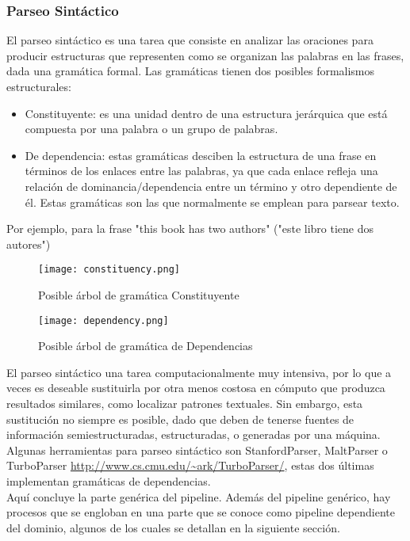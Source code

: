 \subsubsection{Parseo Sintáctico}
El parseo sintáctico es una tarea que consiste en analizar las oraciones para producir estructuras que representen como se organizan las palabras en las frases, dada una gramática formal. Las gramáticas tienen dos posibles formalismos estructurales: 
\begin{itemize}
\item Constituyente: es una unidad dentro de una estructura jerárquica que está compuesta por una palabra o un grupo de palabras. \newline
\item De dependencia: estas gramáticas desciben la estructura de una frase en términos de los enlaces entre las palabras, ya que cada enlace refleja una relación de dominancia/dependencia entre un término y otro dependiente de él. Estas gramáticas son las que normalmente se emplean para parsear texto. 
\end{itemize}
Por ejemplo, para la frase \textsf{"this book has two authors" ("este libro tiene dos autores")} \newline
\begin{figure}[H]%
\centering
\texttt{[image: constituency.png]}  %
\label{}
\caption{Posible árbol de gramática Constituyente}   
\end{figure}
\begin{figure}[H]%
\centering
\texttt{[image: dependency.png]}  %
\label{}
\caption{Posible árbol de gramática de Dependencias}   
\end{figure}

 El parseo sintáctico una tarea computacionalmente muy intensiva, por lo que a veces es deseable sustituirla por otra menos costosa en cómputo que produzca resultados similares, como \textsf{localizar patrones textuales}. Sin embargo, esta sustitución no siempre es posible, dado que deben de tenerse fuentes de información semiestructuradas, estructuradas, o generadas por una máquina. \newline
 Algunas herramientas para parseo sintáctico son \textsf{StanfordParser}, \textsf{MaltParser} \citet{nivre2006maltparser} o \textsf{TurboParser} \url{http://www.cs.cmu.edu/~ark/TurboParser/}, estas dos últimas implementan gramáticas de dependencias.
\\[\baselineskip]
Aquí concluye la parte genérica del pipeline. Además del pipeline genérico, hay procesos que se engloban en una parte que se conoce como pipeline dependiente del dominio, algunos de los cuales se detallan en la siguiente sección.

